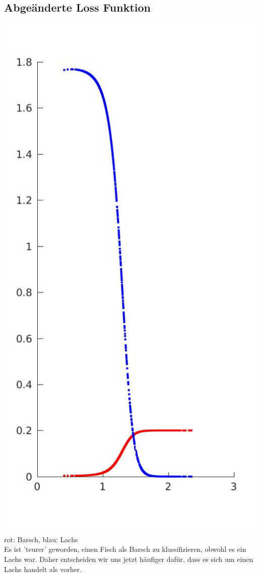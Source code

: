 \documentclass{scrartcl}
\begin{document}
\subsection{Abgeänderte Loss Funktion}
\includegraphics[width=.6\textwidth]{plots/3d_conditional_risk.jpg}\\
rot: Barsch, blau: Lachs\\

Es ist 'teurer' geworden, einen Fisch als Barsch zu klassifizieren, obwohl es ein Lachs war. Daher entscheiden wir uns jetzt häufiger dafür, dass es sich um einen Lachs handelt als vorher.
\end{document}
